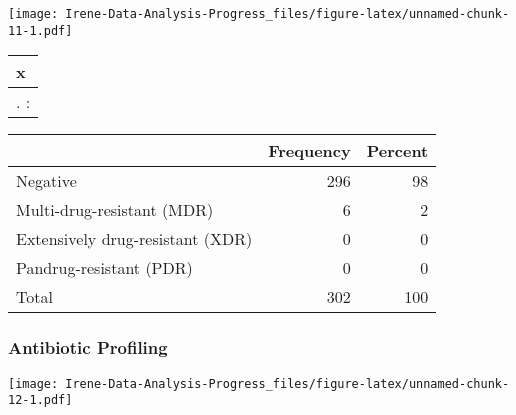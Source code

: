 \documentclass[
]{article}
\begin{document}
\texttt{[image: Irene-Data-Analysis-Progress\_files/figure-latex/unnamed-chunk-11-1.pdf]}

\begin{table}
\caption{\label{tab:unnamed-chunk-11}Multdrug Resistance Organisms MDR}
\begin{table}

\centering
\begin{tabular}[t]{l}
\hline
x\\
\hline
. :\\
\hline
\end{tabular}
\end{table}\begin{table}

\centering
\begin{tabular}[t]{l|r|r}
\hline
  & Frequency & Percent\\
\hline
Negative & 296 & 98\\
\hline
Multi-drug-resistant (MDR) & 6 & 2\\
\hline
Extensively drug-resistant (XDR) & 0 & 0\\
\hline
Pandrug-resistant (PDR) & 0 & 0\\
\hline
Total & 302 & 100\\
\hline
\end{tabular}
\end{table}
\end{table}

\hypertarget{antibiotic-profiling}{%
\subsubsection{Antibiotic Profiling}\label{antibiotic-profiling}}

\texttt{[image: Irene-Data-Analysis-Progress\_files/figure-latex/unnamed-chunk-12-1.pdf]}
\end{document}
